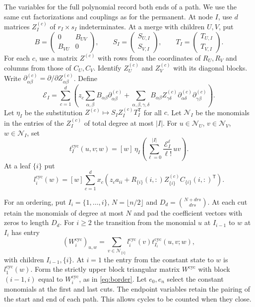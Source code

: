 \documentclass[11pt,reqno]{amsart}
\theoremstyle{remark}
\numberwithin{equation}{section}
\begin{document}
The variables for the full polynomial record both ends of a
path. We use the same cut factorizations and couplings as for
the permanent.
At node \(I\),
use \(d\) matrices \(Z_I^{(c)}\) of \(r_I\times s_I\)
indeterminates. At a merge with children \(U,V\), put
\[
 B=\begin{pmatrix}0&B_{UV}\\B_{VU}&0\end{pmatrix},\qquad
 S_I=\begin{pmatrix}S_{U,I}\\ S_{V,I}\end{pmatrix},\qquad
 T_I=\begin{pmatrix}T_{U,I}\\ T_{V,I}\end{pmatrix}.
\]
For each \(c\), use a matrix \(Z^{(c)}\) with rows from the
coordinates of \(R_U,R_V\) and columns from those of \(C_U,C_V\).
Identify \(Z_U^{(c)}\) and \(Z_V^{(c)}\) with its diagonal blocks.
Write \(\partial_{\alpha\beta}^{(c)}=\partial/\partial Z_{\alpha\beta}^{(c)}\).
Define
\begin{equation}\label{eq:cycle-operator}
 \mathcal E_I=\sum_{c=1}^d\left(
 z_c\sum_{\alpha,\beta}B_{\alpha\beta}\partial_{\alpha\beta}^{(c)}
 +\sum_{\alpha,\beta,\gamma,\delta}
 B_{\alpha\beta}Z_{\gamma\delta}^{(c)}
       \partial_{\alpha\delta}^{(c)}\partial_{\gamma\beta}^{(c)}
 \right).
\end{equation}
Let \(\eta_I\) be the substitution \(Z^{(c)}\mapsto S_I Z_I^{(c)}T_I^{\mathsf T}\)
for all \(c\). Let \(\mathcal N_I\) be the monomials in the entries
of the \(Z_I^{(c)}\) of total degree at most \(|I|\). For
\(u\in\mathcal N_U\), \(v\in\mathcal N_V\), \(w\in\mathcal N_I\), set
\begin{equation}\label{eq:cycle-entries}
 t_I^{\mathrm{cyc}}(u,v;w)=[w]\,\eta_I\!\left(
         \sum_{\ell=0}^{|I|}\frac{\mathcal E_I^\ell}{\ell!}\,uv
                                          \right).
\end{equation}
At a leaf \(\{i\}\) put
\[
 l_i^{\mathrm{cyc}}(w)=[w]\sum_{c=1}^d x_c
 \left(z_c a_{ii}+R_{\{i\}}(i,:)Z_{\{i\}}^{(c)}C_{\{i\}}(i,:)^{\mathsf T}\right).
\]

For an ordering, put \(I_i=\{1,\ldots,i\}\), \(N=\lfloor n/2\rfloor\)
and \(D_d=\binom{N+drs}{drs}\). At each cut retain the monomials
of degree at most \(N\) and pad the coefficient vectors with
zeros to length \(D_d\). For \(i\geq2\) the transition from the
monomial \(u\) at \(I_{i-1}\) to \(w\) at \(I_i\) has entry
\[
 (W_i^{\mathrm{cyc}})_{u,w}
   =\sum_{v\in\mathcal N_{\{i\}}}
       l_i^{\mathrm{cyc}}(v)t_{I_i}^{\mathrm{cyc}}(u,v;w),
\]
with children \(I_{i-1},\{i\}\). At \(i=1\) the entry from the
constant state to \(w\) is \(l_1^{\mathrm{cyc}}(w)\). Form the
strictly upper block triangular matrix \(W^{\mathrm{cyc}}\)
with block \((i-1,i)\) equal to \(W_i^{\mathrm{cyc}}\), as in
\eqref{eq:border}. Let \(e_0,e_n\) select the constant monomials
at the first and last cuts.
The endpoint variables retain the pairing of the start and end
of each path. This allows cycles to be counted when they close.
\end{document}
